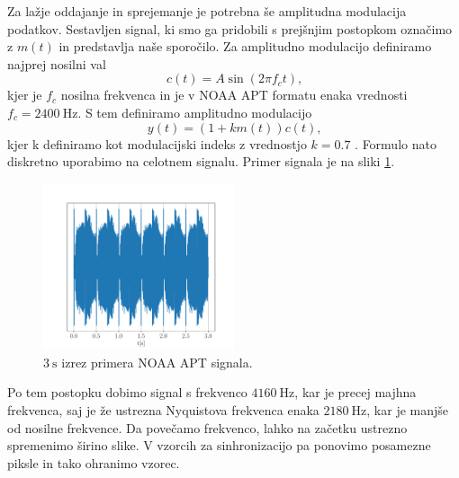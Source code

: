 \documentclass{article}
\begin{document}
Za lažje oddajanje in sprejemanje je potrebna še amplitudna modulacija podatkov. Sestavljen signal, ki smo ga pridobili s prejšnjim postopkom označimo z $m(t)$ in predstavlja naše sporočilo. Za amplitudno modulacijo definiramo najprej nosilni val
\begin{equation*}
	c(t) = A \sin{(2\pi f_c t)}\text{,}
\end{equation*}
kjer je $f_c$ nosilna frekvenca in je v NOAA APT formatu enaka vrednosti $f_c=\SI{2400}{\hertz}$. S tem definiramo amplitudno modulacijo 
\begin{equation*}
	y(t) = (1 + km(t))c(t)\text{,}
\end{equation*}
kjer k definiramo kot modulacijski indeks z vrednostjo $k=0.7$ \cite{am_wiki}. Formulo nato diskretno uporabimo na celotnem signalu. Primer signala je na sliki \ref{fig:signal_example}. 
\begin{figure}[H]
    \centering
    \includegraphics[width=0.5\textwidth]{signal_example.pdf}
    \caption{$\SI{3}{\second}$ izrez primera NOAA APT signala.}
    \label{fig:signal_example}
\end{figure}
Po tem postopku dobimo signal s frekvenco $\SI{4160}{\hertz}$, kar je precej majhna frekvenca, saj je že ustrezna Nyquistova frekvenca enaka $\SI{2180}{\hertz}$, kar je manjše od nosilne frekvence. Da povečamo frekvenco, lahko na začetku ustrezno spremenimo širino slike. V vzorcih za sinhronizacijo pa ponovimo posamezne piksle in tako ohranimo vzorec. 
\end{document}
